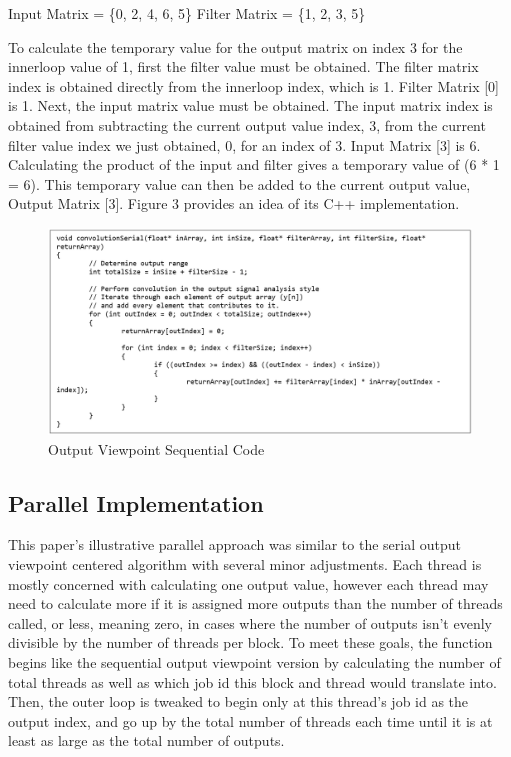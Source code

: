 \documentclass{article}
\begin{document}
\hfil Input Matrix = \{0, 2, 4, 6, 5\}	Filter Matrix = \{1, 2, 3, 5\} \par

To calculate the temporary value for the output matrix on index 3 for the innerloop value of 1, first the filter value must be obtained. The filter matrix index is obtained directly from the innerloop index, which is 1. Filter Matrix [0] is 1. Next, the input matrix value must be obtained. The input matrix index is obtained from subtracting the current output value index, 3, from the current filter value index we just obtained, 0, for an index of 3. Input Matrix [3] is 6. Calculating the product of the input and filter gives a temporary value of (6 * 1 = 6). This temporary value can then be added to the current output value, Output Matrix [3]. Figure 3 provides an idea of its C++ implementation.

\begin{figure}[htp]
    \centering
    \includegraphics[width=\textwidth]{1048_3.png}
    \caption{Output Viewpoint Sequential Code}
    \label{fig:outpoint view code}
\end{figure}

\subsection{Parallel Implementation}
This paper’s illustrative parallel approach was similar to the serial output viewpoint centered algorithm with several minor adjustments. Each thread is mostly concerned with calculating one output value, however each thread may need to calculate more if it is assigned more outputs than the number of threads called, or less, meaning zero, in cases where the number of outputs isn’t evenly divisible by the number of threads per block. To meet these goals, the function begins like the sequential output viewpoint version by calculating the number of total threads as well as which job id this block and thread would translate into. Then, the outer loop is tweaked to begin only at this thread’s job id as the output index, and go up by the total number of threads each time until it is at least as large as the total number of outputs. 
\end{document}
